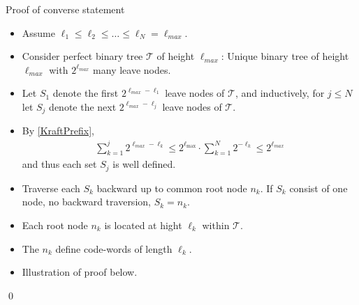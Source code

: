 

\begin{frame}{Proof of converse statement}
\begin{itemize}
\item Assume $\ell_1\leq \ell_2\leq \dots\leq \ell_N=\ell_{max}$. 
\item Consider perfect binary tree $\mathcal{T}$ of height $\ell_{max}$: Unique binary tree of height $\ell_{max}$ with $2^{\ell_{max}}$ many leave nodes. 
\item Let $S_1$ denote the first $2^{\ell_{max}-\ell_1}$ leave nodes of $\mathcal{T}$, and inductively, for $j\leq N$ let $S_{j}$ denote the next $2^{\ell_{max}-\ell_j}$ leave nodes of $\mathcal{T}$.
\item By \eqref{KraftPrefix}, 
\begin{align*}
\sum_{k=1}^j2^{\ell_{max}-\ell_k}\leq 2^{\ell_{\max}}\cdot \sum_{k=1}^{N}2^{-\ell_k}\leq 2^{\ell_{max}}
\end{align*}
and thus each set $S_j$ is well defined.
\item Traverse each $S_k$ backward up to common root node $n_k$. If $S_k$ consist of one node, no backward traversion, $S_k=n_k$. 
\item Each root node $n_k$ is located at hight $\ell_k$ within $\mathcal{T}$. 
\item [\iarrow] The $n_k$ define code-words of length $\ell_k$.  
\item  Illustration of proof below.  

\end{itemize}
\qed
\end{frame}


